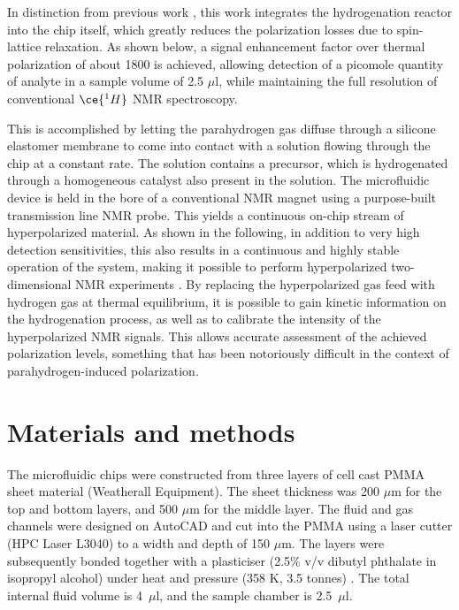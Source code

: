 In distinction from previous work
\cite{bhattacharya2007towards,chekmenev2008pasadena,
chekmenev2009hyperpolarized,shchepin2014parahydrogen,
Reineri:2015he,cavallari201813,eills2017singlet,Lehmkuhl:2018cd},
this work integrates the hydrogenation reactor into the chip itself, which greatly
reduces the polarization losses due to spin-lattice relaxation.
As shown below, a signal enhancement factor over thermal polarization
of about 1800 is achieved, allowing detection of a
picomole quantity of analyte in a sample volume of 2.5 $\mu$l,
while maintaining the full resolution of conventional $\ce{^1H}$
NMR spectroscopy.

This is accomplished by letting the parahydrogen gas diffuse through a
silicone elastomer membrane \cite{Lehmkuhl:2018cd}
to come into contact with a solution
flowing through the chip at a constant rate. The solution
contains a precursor, which is hydrogenated through a homogeneous
catalyst also present in the solution.
The microfluidic device is held in the bore of a conventional
NMR magnet using a purpose-built transmission line NMR probe.
This yields a continuous on-chip stream of hyperpolarized material. As shown
in the following, in addition to very high detection
sensitivities, this also results in a continuous and highly stable operation
of the system, making it possible to perform hyperpolarized
two-dimensional NMR experiments \cite{Roth:2010hk,Giraudeau:2009fn,Lloyd:2012cf,Eshuis:2015ce}.
By replacing the hyperpolarized gas feed with hydrogen gas at thermal
equilibrium, it is possible to gain kinetic information on the hydrogenation
process, as well as to calibrate the intensity of the hyperpolarized NMR signals.
This allows accurate assessment of the achieved polarization levels, something
that has been notoriously difficult in the context of
parahydrogen-induced polarization.


\section{Materials and methods}\label{pHMaterialandMethods}
The
microfluidic chips were constructed from three layers of cell cast PMMA sheet
material (Weatherall Equipment).  The sheet thickness was 200 $\mu$m for the
top and bottom layers, and 500 $\mu$m for the middle layer. The fluid and gas
channels were designed on AutoCAD and cut into the PMMA using a laser cutter
(HPC Laser L3040) to a width and depth of 150 $\mu$m. The layers were
subsequently bonded together with a plasticiser (2.5\% v/v dibutyl phthalate in
isopropyl alcohol) under heat and pressure (358 K, 3.5
tonnes) \cite{Yilmaz:2016fx}. The total internal fluid volume is 4~$\mu$l, and
the sample chamber is 2.5~$\mu$l.

